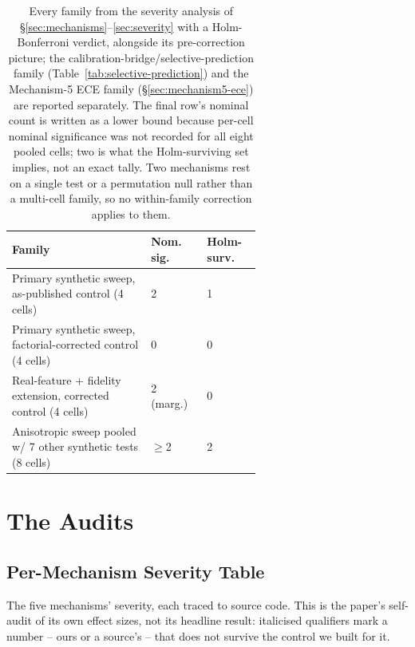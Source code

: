 \documentclass{article}
\begin{document}
\begin{table}[t]
\centering
\small
\begin{tabular}{@{}p{0.42\linewidth}p{0.10\linewidth}p{0.10\linewidth}@{}}
\toprule
Family & Nom. sig. & Holm-surv. \\
\midrule
Primary synthetic sweep, as-published control (4 cells) & 2 & 1 \\
Primary synthetic sweep, factorial-corrected control (4 cells) & 0 & 0 \\
Real-feature + fidelity extension, corrected control (4 cells) & 2 (marg.) & 0 \\
Anisotropic sweep pooled w/ 7 other synthetic tests (8 cells) & $\geq$2 & 2 \\
\bottomrule
\end{tabular}
\caption{Every family from the severity analysis of
\S\ref{sec:mechanisms}--\ref{sec:severity} with a Holm-Bonferroni verdict,
alongside its pre-correction picture; the calibration-bridge/selective-prediction
family (Table~\ref{tab:selective-prediction}) and the Mechanism-5 ECE family
(\S\ref{sec:mechanism5-ece}) are reported separately. The final row's nominal
count is written as a lower bound because per-cell nominal significance was
not recorded for all eight pooled cells; two is what the Holm-surviving set
implies, not an exact tally. Two mechanisms rest on
a single test or a permutation null rather than a multi-cell family, so no
within-family correction applies to them.}
\label{tab:holm}
\end{table}

\section{The Audits}

\subsection{Per-Mechanism Severity Table}
\label{app:severity}
The five mechanisms' severity, each traced to source code. This is the
paper's self-audit of its own effect sizes, not its headline result:
italicised qualifiers mark a number -- ours or a source's -- that does not
survive the control we built for it.
\end{document}
